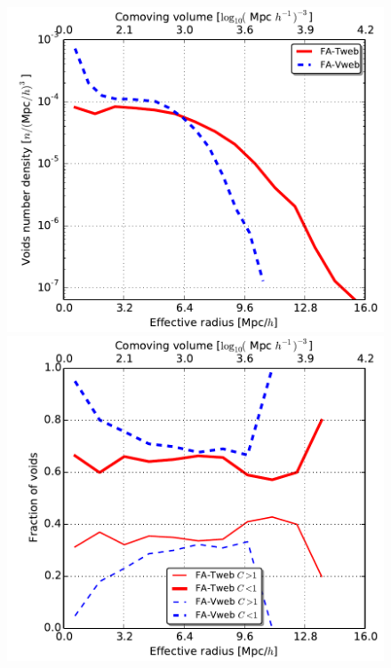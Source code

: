 \documentclass[a4,useAMS,usenatbib,usegraphicx]{mn2e}
\begin{document}
\begin{figure}
\centering

  \includegraphics[trim = 2mm 2mm 2mm 0mm, clip, keepaspectratio=true,
  width=0.35\textheight]{voids_regions_volume_all.pdf}
  \includegraphics[trim = 2mm 2mm 2mm 0mm, clip, keepaspectratio=true,
  width=0.35\textheight]{voids_regions_volume_compensated.pdf}


\end{figure}
\end{document}
